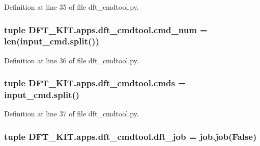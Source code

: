 Definition at line 35 of file dft\+\_\+cmdtool.\+py.

\hypertarget{namespace_d_f_t___k_i_t_1_1apps_1_1dft__cmdtool_a4df77ff242ff65823d46090c1f2264a9}{
\subsubsection[{cmd\+\_\+num}]{\setlength{\rightskip}{0pt plus 5cm}tuple D\+F\+T\+\_\+\+K\+I\+T.\+apps.\+dft\+\_\+cmdtool.\+cmd\+\_\+num = len(input\+\_\+cmd.\+split())}}\label{namespace_d_f_t___k_i_t_1_1apps_1_1dft__cmdtool_a4df77ff242ff65823d46090c1f2264a9}


Definition at line 36 of file dft\+\_\+cmdtool.\+py.

\hypertarget{namespace_d_f_t___k_i_t_1_1apps_1_1dft__cmdtool_ae4e59628a7aea11f8ee1b4f913d7f6e3}{
\subsubsection[{cmds}]{\setlength{\rightskip}{0pt plus 5cm}tuple D\+F\+T\+\_\+\+K\+I\+T.\+apps.\+dft\+\_\+cmdtool.\+cmds = input\+\_\+cmd.\+split()}}\label{namespace_d_f_t___k_i_t_1_1apps_1_1dft__cmdtool_ae4e59628a7aea11f8ee1b4f913d7f6e3}


Definition at line 37 of file dft\+\_\+cmdtool.\+py.

\hypertarget{namespace_d_f_t___k_i_t_1_1apps_1_1dft__cmdtool_a199f85e4cd240a8ea565d8d8638cca2e}{
\subsubsection[{dft\+\_\+job}]{\setlength{\rightskip}{0pt plus 5cm}tuple D\+F\+T\+\_\+\+K\+I\+T.\+apps.\+dft\+\_\+cmdtool.\+dft\+\_\+job = job.\+job(False)}}\label{namespace_d_f_t___k_i_t_1_1apps_1_1dft__cmdtool_a199f85e4cd240a8ea565d8d8638cca2e}


